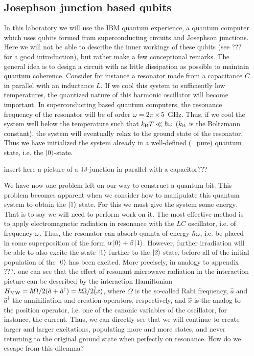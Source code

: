 \documentclass{../lab}
\begin{document}
\subsection{Josephson junction based qubits}
In this laboratory we will use the IBM quantum experience, a quantum computer which uses qubits formed from superconducting circuits and Josephson junctions. Here we will not be able to describe the inner workings of these qubits (see ??? for a good introduction), but rather make a few conceptional remarks. The general idea is to design a circuit with as little dissipation as possible to maintain quantum coherence. Consider for instance a resonator made from a capacitance $C$ in parallel with an inductance $L$. If we cool this system to sufficiently low temperatures, the quantized nature of this harmonic oscillator will become important. In superconducting based quantum computers, the resonance frequency of the resonator will be of order $\omega = 2\pi\times 5$~GHz. Thus, if we cool the system well below the temperature such that $k_{\rm B} T \ll \hbar \omega$ ($k_{\rm B}$ is the Boltzmann constant), the system will eventually relax to the ground state of the resonator. Thus we have initialized the system already in a well-defined (=pure) quantum state, i.e. the $\ket{0}$-state. 

insert here a picture of a JJ-junction in parallel with a capacitor???

We have now one problem left on our way to construct a quantum bit. This problem becomes apparent when we consider how to manipulate this quantum system to obtain the $\ket{1}$ state. For this we must give the system some energy. That is to say we will need to perform work on it. The most effective method is to apply electromagnetic radiation in resonance with the $LC$ oscillator, i.e. of frequency $\omega$. Thus, the resonator can absorb quanta of energy $\hbar \omega$, i.e. be placed in some superposition of the form $\alpha \ket{0} + \beta \ket{1}$. However, further irradiation will be able to also excite the state $\ket{1}$ further to the $\ket{2}$ state, before all of the initial population of the $\ket{0}$ has been excited. More precisely, in analogy to appendix ???, one can see that the effect of resonant microwave radiation in the interaction picture can be described by the interaction Hamiltonian $H_{\rm MW}=\hbar \Omega/2 (\hat{a}+ \hat{a}^\dagger)= \hbar \Omega/2 \hat(x)$, where $\Omega$ is the so-called Rabi frequency, $\hat{a}$ and $\hat{a}^\dagger$ the annihiliation and creation operators, respectively, and $\hat{x}$ is the analog to the position operator, i.e. one of the canonic variables of the oscillator, for instance, the current. Thus, we can directly see that we will continue to create larger and larger excitations, populating more and more states, and never returning to the original ground state when perfectly on resonance. How do we escape from this dilemma? 
\end{document}
